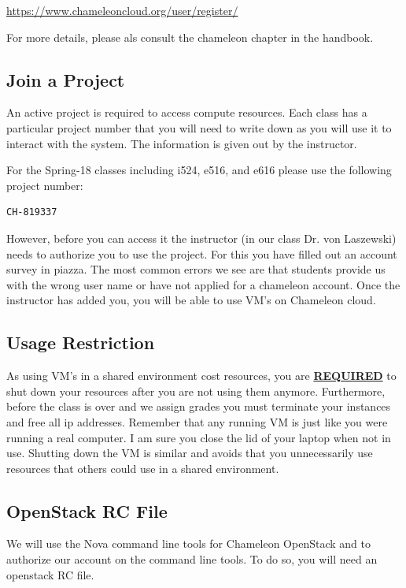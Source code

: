 \url{https://www.chameleoncloud.org/user/register/}

For more details, please als consult the chameleon chapter in the
handbook.

\subsection{Join a Project}

An active project is required to access compute resources.  Each class
has a particular project number that you will need to write down as
you will use it to interact with the system. The information is
given out by the instructor. 

For the Spring-18 classes including i524, e516, and e616 please use
the following project number:

\begin{lstlisting}
CH-819337
\end{lstlisting}

However, before you can access it the instructor (in our class Dr. von
Laszewski) needs to authorize you to use the project. For this you
have filled out an account survey in piazza. The most common errors we
see are that students provide us with the wrong user name or have not
applied for a chameleon account. Once the instructor has added you,
you will be able to use VM's on Chameleon cloud. 

\subsection{Usage Restriction}

As using VM's in a shared environment cost resources, you are
{\underline\bf REQUIRED} to shut down your resources after you are not
using them anymore. Furthermore, before the class is over and we
assign grades you must terminate your instances and free all ip
addresses. Remember that any running VM is just like you were running
a real computer. I am sure you close the lid of your laptop when not
in use. Shutting down the VM is similar and avoids that you
unnecessarily use resources that others could use in a shared
environment.


\subsection{OpenStack RC File}

We will use the Nova command line tools for Chameleon OpenStack and to
authorize our account on the command line tools. To do so, you will
need an openstack RC file. 


